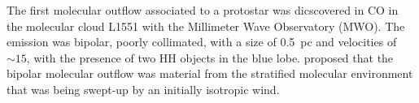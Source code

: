 \documentclass[12pt]{mythesis}
\begin{document}


The first molecular outflow associated to a protostar was dicscovered in CO in the molecular cloud L1551 \citep{snell1980}
with the Millimeter Wave Observatory (MWO). The emission was bipolar, poorly collimated, with a size of 0.5~pc and velocities of $\sim 15$\kms, with the presence of two HH objects in the blue lobe. \citet{snell1980} proposed that the bipolar molecular outflow was material from the stratified molecular environment that was being swept-up by an initially isotropic wind.

\end{document}
